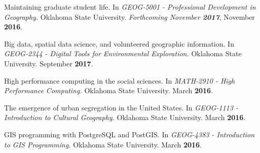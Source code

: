 \begin{cventries}

  \cventry
    {}
    {}
    {}
    {}
    {
       \begin{cvitems}
          \vspace{-3mm}
        \item {Maintaining graduate student life. In \textit{GEOG-5001 -
              Professional Development in Geography.} Oklahoma State University.
            \textit{Forthcoming November \textbf{2017}}, November
            \textbf{2016}.}
          \end{cvitems}
        } %

  \cventry
    {}
    {}
    {}
    {}
    {
      \begin{cvitems}
        \vspace{-3mm}
      \item {Big data, spatial data science, and volunteered geographic
          information. In \textit{GEOG-2344 - Digital Tools for Environmental
            Exploration.} Oklahoma State University. September \textbf{2017}}.
        \end{cvitems}
    }

  \cventry
    {}
    {}
    {}
    {}
    {
       \begin{cvitems}
         \vspace{-3mm}
       \item {High performance computing in the social sciences. In
           \textit{MATH-2910 - High Performance Computing.} Oklahoma State
           University. March \textbf{2016}.}
          \end{cvitems}
        } %
          
  \cventry
    {}
    {}
    {}
    {}
    {
       \begin{cvitems}
          \vspace{-3mm}
        \item {The emergence of urban segregation in the United States. In
            \textit{GEOG-1113 - Introduction to Cultural Geography.} Oklahoma
            State University. March \textbf{2016}.}
          \end{cvitems}
        } %

  \cventry
    {}
    {}
    {}
    {}
    {
      \begin{cvitems}
        \vspace{-3mm}
      \item {GIS programming with PostgreSQL and PostGIS. In \textit{GEOG-4383 -
            Introduction to GIS Programming.} Oklahoma State University. March
          \textbf{2016}.}
            \end{cvitems}
        } %


\end{cventries}
